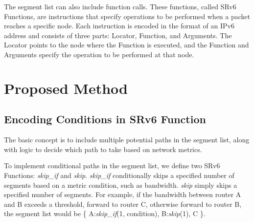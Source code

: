 \documentclass[conference]{IEEEtran}
\begin{document}
The segment list can also include function calls. These functions, called SRv6 Functions, are instructions that specify operations to be performed when a packet reaches a specific node.
Each instruction is encoded in the format of an IPv6 address and consists of three parts: Locator, Function, and Arguments.
The Locator points to the node where the Function is executed, and the Function and Arguments specify the operation to be performed at that node.



\section{Proposed Method}
\subsection{Encoding Conditions in SRv6 Function}

The basic concept is to include multiple potential paths in the segment list, along with logic to decide which path to take based on network metrics.

To implement conditional paths in the segment list, we define two SRv6 Functions: \textit{skip\_if} and \textit{skip}.
\textit{skip\_if} conditionally skips a specified number of segments based on a metric condition, such as bandwidth.
\textit{skip} simply skips a specified number of segments.
For example, if the bandwidth between router A and B exceeds a threshold, forward to router C, otherwise forward to router B, the segment list would be \{ A:\textit{skip\_if}(1, condition), B:\textit{skip}(1), C \}.
\end{document}
